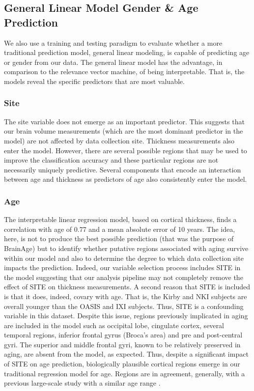 \subsection{General Linear Model Gender \& Age Prediction} 
We also use a training and testing paradigm to evaluate whether a more
traditional prediction model, general linear modeling, is capable of
predicting age or gender from our data.  The general linear model has
the advantage, in comparison to the relevance vector machine, of being
interpretable.  That is, the models reveal the specific predictors
that are most valuable.  

\subsubsection{Site} 
The site variable does not emerge as an important predictor.  This
suggests that our brain volume measurements (which are the most
dominant predictor in the model) are not affected by data collection
site.  Thickness measurements also enter the model.  However, there
are several possible regions that may be used to improve the
classification accuracy and these particular regions are not
necessarily uniquely predictive.  Several components that encode an
interaction between age and thickness as predictors of age also
consistently enter the model.  

\subsubsection{Age} 
The interpretable linear regression model, based on cortical
thickness, finds a correlation with age of 0.77 and a mean absolute
error of 10 years.  The idea, here, is not to produce the best
possible prediction (that was the purpose of BrainAge) but to identify
whether putative regions associated with aging survive within our
model and also to determine the degree to which data collection site
impacts the prediction.  Indeed, our variable selection process
includes SITE in the model suggesting that our analysis pipeline
may not completely remove the effect of SITE on thickness
measurements.  A second reason that SITE is included is that it does,
indeed, covary with age.  That is, the Kirby and NKI subjects are
overall younger than the OASIS and IXI subjects.  Thus, SITE is a
confounding variable in this dataset.  Despite this issue, regions
previously implicated in aging are included in the model such as
occipital lobe, cingulate cortex, several temporal regions, inferior
frontal gyrus (Broca's area) and pre and post-central gyri.  The
superior and middle frontal gyri, known to be relatively preserved in
aging, are absent from the model, as expected.  Thus, despite a
significant impact of SITE on age prediction, biologically plausible
cortical regions emerge in our traditional regression model for age.  
Regions are in agreement, generally, with a
previous large-scale study with a similar age range
\cite{groves2012}. 

